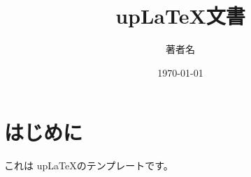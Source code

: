 \documentclass[uplatex,dvipdfmx]{jsarticle}
\title{up\LaTeX 文書}
\author{著者名}
\date{\today}
\begin{document}
\maketitle

\section{はじめに}

これは up\LaTeX のテンプレートです。
\end{document}
